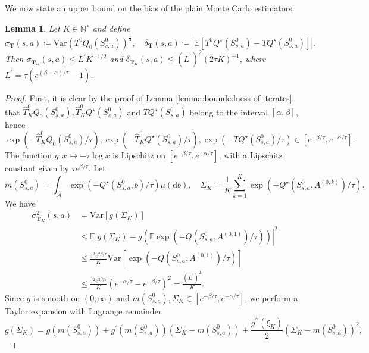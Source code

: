 \documentclass[11pt]{article}
\numberwithin{equation}{section}
\newtheorem{lemma}[theorem]{Lemma}
\theoremstyle{definition}
\theoremstyle{remark}
\def\cA{\mathcal{A}}
\def\d{{\mathrm{d}}}
\def\N{{\mathbb{N}}}
\begin{document}
We now state an upper bound on the bias of the plain Monte Carlo estimators.
\begin{lemma}
    \label{lemma:additional-MC-bias}
    Let $K \in \N^\star$ and define
    $$
     \sigma_{\mathbf T}(s,a)  \coloneqq \mathrm{Var} \left(T^0 Q_0 \left(S^0_{s,a}\right)\right)^{\frac{1}{2}},
        \quad
        \delta_{\mathbf T}(s,a) \coloneqq \left| \mathbb E \left[ T^0Q^\star\left(S^0_{s,a}\right) - TQ ^{\star}\left(S^0_{s,a}\right)\right] \right|.
    $$
    Then  
    $\sigma_{\mathbf T_K}(s,a) \leq L^\prime K^{-1/2}$ and $ \delta_{ \mathbf{T}_K} (s,a) \leq (L^\prime)^2 (2 \tau K) ^{-1}$,
    where $L^\prime  = \tau \left( e^{(\beta - \alpha) / \tau} - 1 \right)$.
\end{lemma}
\begin{proof}
    First, it is clear by the proof of Lemma \ref{lemma:boundedness-of-iterates} that $\hat{T}_K^0 Q_0(S^0_{s,a}),\hat{T}_K^0 Q^\star(S^0_{s,a})$ and $TQ^\star(S^0_{s,a})$ belong to the interval \(\left[ \alpha, \beta  \right]\),
    hence 
    $$
    \exp \left(-\hat{T}_K^0 Q_0(S^0_{s,a}) / \tau\right),\exp \left(- \hat{T}_K^0 Q^\star(S^0_{s,a})/ \tau \right),\exp \left(-TQ^\star(S^0_{s,a}) / \tau \right) \in \left[e^{-\beta / \tau}, e ^{-\alpha/ \tau}\right].
    $$
    The function $g:x \mapsto -\tau \log x$ is Lipschitz on $\left[e^{-\beta / \tau}, e ^{-\alpha/ \tau}\right]$, with a Lipschitz constant given by
$ \tau e^{\beta/ \tau}$.
Let 
$$
    m (S_{s,a}^0) = \int_{\cA} \exp(- Q^\star(S_{s,a}^0, b) / \tau) \mu(\d b), \quad \Sigma_K = \frac{1}{K}\sum_{k = 1}^K \exp(-Q^\star(S_{s,a}^0, A^{(0,k)}) / \tau).
    $$
We have
    \[
    \begin{aligned}
    \sigma^2_{\mathbf T_K}(s,a) &= \mathrm{Var} \left[ g \left( \Sigma_K \right) \right] \\
    & \leq \mathbb E \left|  g \left( \Sigma_K \right) - g \left(\mathbb E \exp \left(-Q(S^0_{s,a}, A^{(0,1)}) / \tau \right) \right)\right|^2 \\
    & \leq \frac{\tau^2 e^{2\beta / \tau}}{K} \mathrm{Var} \left[ \exp \left(-Q \left(S_{s,a}^0,A^{(0,1)}\right) / \tau \right) \right] \\
    & \leq \frac{\tau^2 e^{2\beta / \tau}}{K} \left( e^{-\alpha / \tau} - e^{-\beta / \tau}  \right)^2 = \frac{(L^\prime)^2}{K}.
    \end{aligned}
    \]
     Since $g$ is smooth on $(0,\infty)$ and $m (S_{s,a}^0),\Sigma_K \in [e^{-\beta / \tau}, e^{-\alpha / \tau}]$, we perform a Taylor expansion with Lagrange remainder
    \[
    g(\Sigma_K) = g(m(S_{s,a}^0)) + g^\prime(m(S^0_{s,a})) (\Sigma_K - m(S^0_{s,a})) + \frac{g^{\prime \prime}(\xi_K)}{2} (\Sigma_K - m(S^0_{s,a}))^2,
\]
\end{proof}
\end{document}
